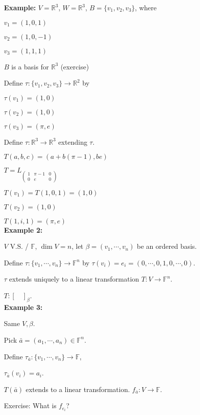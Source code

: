 \documentclass[12pt]{article}
\theoremstyle{plain}
\newcommand{\mR}{{\mathbb{R}}}
\newcommand{\mF}{{\mathbb{F}}}
\begin{document}
	{\color{Brown}
	\textbf{Example: }
	$V = \mR^3$, $W = \mR^3$, $B = \{v_1, v_2, v_3\}$, where 
	\begin{description}
		\item $v_1 = (1, 0, 1)$
		\item $v_2 = (1, 0, -1)$
		\item $v_3 = (1, 1, 1)$
	\end{description}

	$B$ is a basis for $\mR^3$ (exercise)

	Define $\tau :\{v_1, v_2,v_3\} \to \mR^2$ by 
	\begin{description}
		\item $\tau(v_1) = (1, 0)$
		\item $\tau(v_2) = (1, 0)$
		\item $\tau(v_3) = (\pi, e)$
	\end{description}
	Define $\tau: \mR^3 \to \mR^3$ extending $\tau$. 

	$T(a,b,c) = (a + b(\pi-1), be)$ 

	$T = L_{\begin{pmatrix}
			1 & \pi-1 & 0\\
			0 & e & 0
	\end{pmatrix}}$

	$T(v_1) = T(1, 0, 1) = (1, 0)$

	$T(v_2) = (1, 0)$ 
	
	$T(1, i , 1) = (\pi, e)$ \\
	
	\textbf{Example 2: }

	$V$ V.S. / $\mF$, $\dim V= n$, let $\beta = (v_1, \cdots, v_n)$ be an 
	ordered basis. 

	Define $\tau : \{v_1, \cdots, v_n\} \to \mF^n$ by $\tau(v_i) = 
	e_i = (0, \cdots, 0, 1, 0, \cdots, 0)$. 

	$\tau$ extends uniquely to a linear transformation $T : V \to \mF^n$. 

	$T : [\quad ]_{\beta}$. \\

	\textbf{Example 3: }

	Same $V, \beta$. 

	Pick $\bar{a} = (a_1, \cdots, a_n) \in \mF^n$. 

	Define $\tau_{\bar{a}} : \{v_1, \cdots, v_n\} \to \mF$, 

	$\tau_{\bar {a}}(v_i) = a_i$. 

	$T(\bar a)$ extends to a linear transformation. $f_{\bar a} : V\to \mF$.

	Exercise: What is $f_{e_i}$? 

	}
\end{document}
